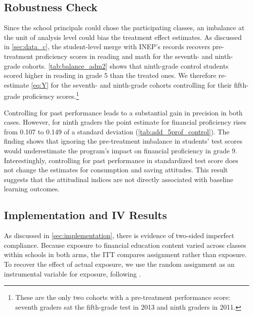 \subsection{Robustness Check} 

Since the school principals could chose the participating classes, an imbalance at the unit of analysis level could bias the treatment effect estimates. As discussed in \autoref{sec:data_c}, the student-level merge with INEP's records recovers pre-treatment proficiency scores in reading and math for the seventh- and ninth-grade cohorts. \autoref{tab:balance_adm2} shows that ninth-grade control students scored higher in reading in grade 5 than the treated ones. We therefore re-estimate \autoref{eq:Y} for the seventh- and ninth-grade cohorts controlling for their fifth-grade proficiency scores.\footnote{These are the only two cohorts with a pre-treatment performance score: seventh graders sat the fifth-grade test in 2013 and ninth graders in 2011.}

Controlling for past performance leads to a substantial gain in precision in both cases. However, for ninth graders the point estimate for financial proficiency rises from 0.107 to 0.149 of a standard deviation (\autoref{tab:add_5prof_control}). The finding shows that ignoring the pre-treatment imbalance in students' test scores would underestimate the program's impact on financial proficiency in grade 9. Interestinghly, controlling for past performance in standardized test score does not change the estimates for consumption and saving attitudes. This result suggests that the attitudinal indices are not directly associated with baseline learning outcomes.  


\subsection{Implementation and IV Results}

As discussed in \autoref{sec:implementation}, there is evidence of two-sided imperfect compliance. Because exposure to financial education content varied across classes within schools in both arms, the ITT compares assignment rather than exposure. To recover the effect of actual exposure, we use the random assignment as an instrumental variable for exposure, following \cite{frisancho2023school}.

